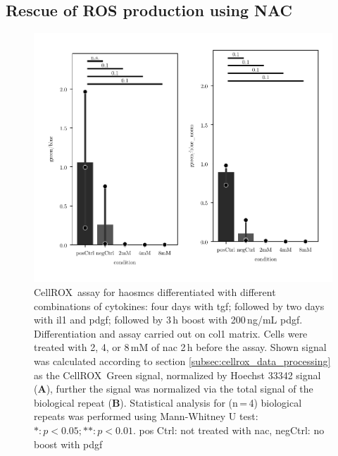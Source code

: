     \subsection{Rescue of ROS production using NAC}
        \begin{figure}[h!]
    \capstart
        \centering
    	\includegraphics{Abbildung/NAC_quench.pdf}

    	\begin{minipage}{\captionwidth}
    		\caption[NAC quench]{ \newline
            CellROX\texttrademark~assay for \acp{haosmc} differentiated with different combinations of cytokines: four days with \ac{tgf}; followed by two days with \ac{il1} and \ac{pdgf}; followed by 3\,h boost with 200\,ng/mL \ac{pdgf}. Differentiation and assay carried out on \ac{col1} matrix. Cells were treated with 2, 4, or 8\,mM of \ac{nac} 2\,h before the assay.
            Shown signal was calculated according to section \ref{subsec:cellrox_data_processing} as the CellROX\texttrademark~Green signal, normalized by Hoechst 33342 signal (\textbf{A}), further the signal was normalized via the total signal of the biological repeat (\textbf{B}). Statistical analysis for (n\,=\,4) biological repeats was performed using Mann-Whitney U test: $*: p < 0.05; **: p < 0.01$.
            pos Ctrl: not treated with \ac{nac}, negCtrl: no boost with \ac{pdgf}}
    		\label{fig:NAC_quench}
    	\end{minipage}
    \end{figure}

